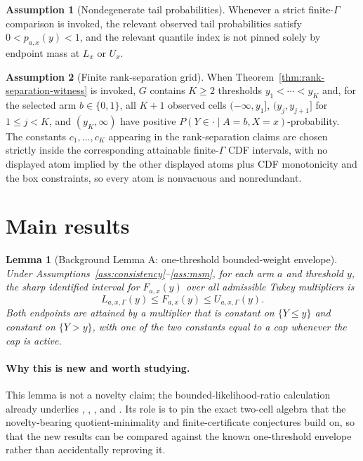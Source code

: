 \documentclass[11pt]{article}
\theoremstyle{definition}
\newtheorem{assumption}{Assumption}
\theoremstyle{plain}
\newtheorem{lemma}{Lemma}
\theoremstyle{remark}
\begin{document}
\begin{assumption}[Nondegenerate tail probabilities]\label{ass:nondegenerate}
Whenever a strict finite-\(\Gamma\) comparison is invoked, the relevant observed tail probabilities satisfy \(0<p_{a,x}(y)<1\), and the relevant quantile index is not pinned solely by endpoint mass at \(L_x\) or \(U_x\).
\end{assumption}

\begin{assumption}[Finite rank-separation grid]\label{ass:separationgrid}
When Theorem~\ref{thm:rank-separation-witness} is invoked, \(G\) contains \(K\ge2\) thresholds \(y_1<\cdots<y_K\) and, for the selected arm \(b\in\{0,1\}\), all \(K+1\) observed cells \((-\infty,y_1]\), \((y_j,y_{j+1}]\) for \(1\le j<K\), and \((y_K,\infty)\) have positive \(P(Y\in\cdot\mid A=b,X=x)\)-probability.  The constants \(c_1,\ldots,c_K\) appearing in the rank-separation claims are chosen strictly inside the corresponding attainable finite-\(\Gamma\) CDF intervals, with no displayed atom implied by the other displayed atoms plus CDF monotonicity and the box constraints, so every atom is nonvacuous and nonredundant.
\end{assumption}

\section{Main results}
\begin{lemma}[Background Lemma A: one-threshold bounded-weight envelope]\label{lem:threshold-envelope}
Under Assumptions~\ref{ass:consistency}--\ref{ass:msm}, for each arm \(a\) and threshold \(y\), the sharp identified interval for \(F_{a,x}(y)\) over all admissible Tukey multipliers is
\[
L_{a,x,\Gamma}(y)\le F_{a,x}(y)\le U_{a,x,\Gamma}(y).
\]
Both endpoints are attained by a multiplier that is constant on \(\{Y\le y\}\) and constant on \(\{Y>y\}\), with one of the two constants equal to a cap whenever the cap is active.
\end{lemma}
\paragraph{Why this is new and worth studying.}
This lemma is not a novelty claim; the bounded-likelihood-ratio calculation already underlies \citet{Tan2006}, \citet{DornGuo2023}, \citet{MastenPoirierRen2025}, and \citet{Wang2026}.  Its role is to pin the exact two-cell algebra that the novelty-bearing quotient-minimality and finite-certificate conjectures build on, so that the new results can be compared against the known one-threshold envelope rather than accidentally reproving it.
\end{document}
